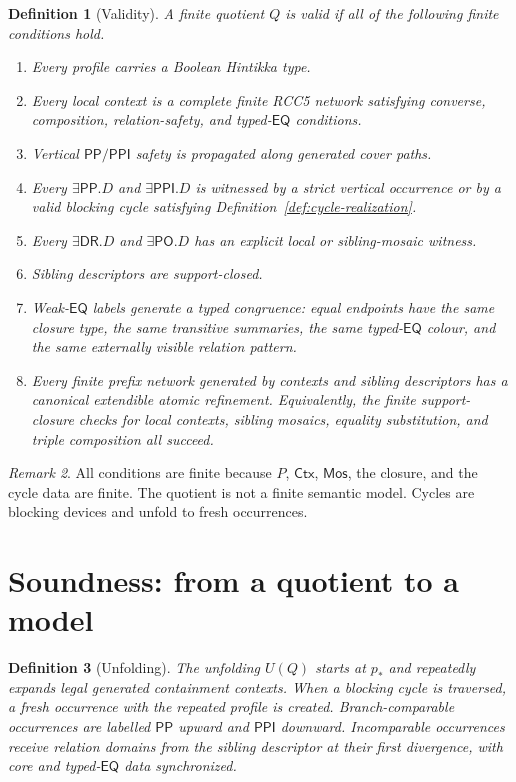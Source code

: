 \documentclass[11pt]{article}
\newtheorem{definition}{Definition}[section]
\theoremstyle{remark}
\newtheorem{remark}[definition]{Remark}
\newcommand{\DR}{\mathsf{DR}}
\newcommand{\PO}{\mathsf{PO}}
\newcommand{\PP}{\mathsf{PP}}
\newcommand{\PPI}{\mathsf{PPI}}
\newcommand{\EQ}{\mathsf{EQ}}
\newcommand{\Ctx}{\mathsf{Ctx}}
\newcommand{\Mos}{\mathsf{Mos}}
\begin{document}
\begin{definition}[Validity]\label{def:validity}
A finite quotient $Q$ is valid if all of the following finite conditions hold.
\begin{enumerate}
\item Every profile carries a Boolean Hintikka type.
\item Every local context is a complete finite RCC5 network satisfying converse, composition, relation-safety, and typed-$\EQ$ conditions.
\item Vertical $\PP/\PPI$ safety is propagated along generated cover paths.
\item Every $\exists\PP.D$ and $\exists\PPI.D$ is witnessed by a strict vertical occurrence or by a valid blocking cycle satisfying Definition~\ref{def:cycle-realization}.
\item Every $\exists\DR.D$ and $\exists\PO.D$ has an explicit local or sibling-mosaic witness.
\item Sibling descriptors are support-closed.
\item Weak-$\EQ$ labels generate a typed congruence: equal endpoints have the same closure type, the same transitive summaries, the same typed-$\EQ$ colour, and the same externally visible relation pattern.
\item Every finite prefix network generated by contexts and sibling descriptors has a canonical extendible atomic refinement.  Equivalently, the finite support-closure checks for local contexts, sibling mosaics, equality substitution, and triple composition all succeed.
\end{enumerate}
\end{definition}

\begin{remark}
All conditions are finite because $P$, $\Ctx$, $\Mos$, the closure, and the cycle data are finite.  The quotient is not a finite semantic model.  Cycles are blocking devices and unfold to fresh occurrences.
\end{remark}

\section{Soundness: from a quotient to a model}
\begin{definition}[Unfolding]
The unfolding $U(Q)$ starts at $p_*$ and repeatedly expands legal generated containment contexts.  When a blocking cycle is traversed, a fresh occurrence with the repeated profile is created.  Branch-comparable occurrences are labelled $\PP$ upward and $\PPI$ downward.  Incomparable occurrences receive relation domains from the sibling descriptor at their first divergence, with core and typed-$\EQ$ data synchronized.
\end{definition}
\end{document}
